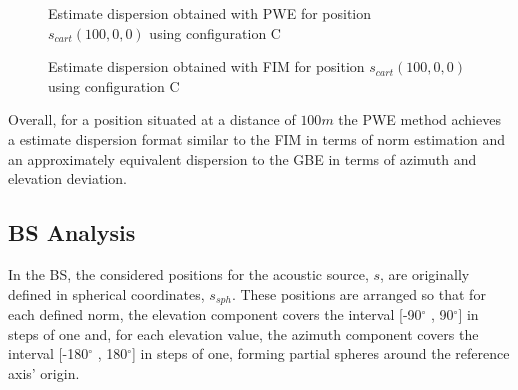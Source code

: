 \begin{figure}[!htbp]
	\captionsetup{justification=centering,margin=2cm}
	\caption{Estimate dispersion obtained with PWE for position $s_{cart}(100,0,0)$ using configuration C}
	\label{fig:SS-estimB-C-100,0,0}
\end{figure}

\begin{figure}[!htbp]
	\captionsetup{justification=centering,margin=2cm}
	\caption{Estimate dispersion obtained with FIM for position $s_{cart}(100,0,0)$ using configuration C}
	\label{fig:SS-fim-C-100,0,0}
\end{figure}

Overall, for a position situated at a distance of $100m$ the PWE method achieves a estimate dispersion format similar to the FIM in terms of norm estimation and an approximately equivalent dispersion to the GBE in terms of azimuth and elevation deviation.

\subsection{BS Analysis}

In the BS, the considered positions for the acoustic source, $s$, are originally defined in spherical coordinates, $s_{sph}$. These positions are arranged so that for each defined norm, the elevation component covers the interval [-90$^{\circ}$ , 90$^{\circ}$] in steps of one and, for each elevation value, the azimuth component covers the interval [-180$^{\circ}$ , 180$^{\circ}$] in steps of one, forming partial spheres around the reference axis' origin.

